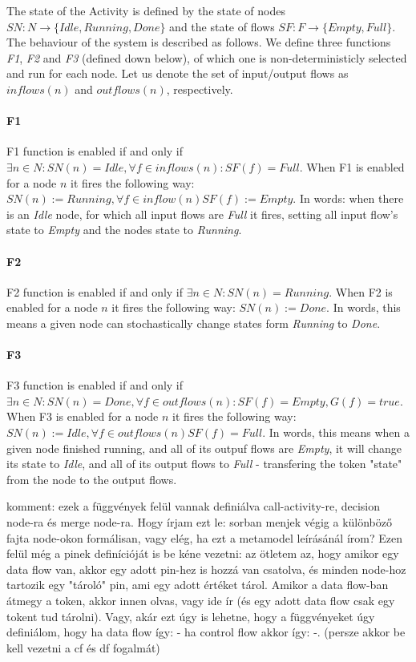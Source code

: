 The state of the Activity is defined by the state of nodes \(SN : N \rightarrow \{ Idle, Running, Done \}\) and the state of flows \(SF : F \rightarrow \{ Empty, Full \} \). The behaviour of the system is described as follows. We define three functions \emph{F1}, \emph{F2} and \emph{F3} (defined down below), of which one is non-deterministicly selected and run for each node. Let us denote the set of input/output flows as \(inflows(n)\) and \(outflows(n)\), respectively.

\paragraph{F1} 

F1 function is enabled if and only if \( \exists n \in N : SN(n) = Idle, \forall f \in inflows(n) : SF(f) = Full \). When F1 is enabled for a node \(n\) it fires the following way: \( SN(n) := Running, \forall f \in inflow(n) SF(f) := Empty \). In words: when there is an \emph{Idle} node, for which all input flows are \emph{Full} it fires, setting all input flow's state to \emph{Empty} and the nodes state to \emph{Running}. 

\paragraph{F2} 

F2 function is enabled if and only if \( \exists n \in N : SN(n) = Running \). When F2 is enabled for a node \(n\) it fires the following way: \( SN(n) := Done \). In words, this means a given node can stochastically change states form \emph{Running} to \emph{Done}.

\paragraph{F3} 

F3 function is enabled if and only if \( \exists n \in N : SN(n) = Done, \forall f \in outflows(n) : SF(f) = Empty, G(f) = true \). When F3 is enabled for a node \(n\) it fires the following way: \( SN(n) := Idle, \forall f \in outflows(n) SF(f) = Full \). In words, this means when a given node finished running, and all of its outpuf flows are \emph{Empty}, it will change its state to \emph{Idle}, and all of its output flows to \emph{Full} - transfering the token "state" from the node to the output flows.

komment: ezek a függvények felül vannak definiálva call-activity-re, decision node-ra és merge node-ra. Hogy írjam ezt le: sorban menjek végig a különböző fajta node-okon formálisan, vagy elég, ha ezt a metamodel leírásánál írom? Ezen felül még a pinek definícióját is be kéne vezetni: az ötletem az, hogy amikor egy data flow van, akkor egy adott pin-hez is hozzá van csatolva, és minden node-hoz tartozik egy "tároló" pin, ami egy adott értéket tárol. Amikor a data flow-ban átmegy a token, akkor innen olvas, vagy ide ír (és egy adott data flow csak egy tokent tud tárolni). Vagy, akár ezt úgy is lehetne, hogy a függvényeket úgy definiálom, hogy ha data flow így: - ha control flow akkor így: -. (persze akkor be kell vezetni a cf és df fogalmát)

